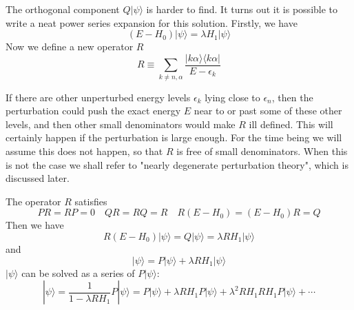 The orthogonal component $Q|\psi\rangle$ is harder to find. It turns out it is possible to write a neat power series expansion for this solution. Firstly, we have
\[(E-H_0)|\psi\rangle = \lambda H_1 |\psi\rangle\]
Now we define a new operator $R$
\[R \equiv \sum_{k \neq n,\alpha} \frac{|k\alpha\rangle \langle k\alpha|}{E-\epsilon_k}\]
\begin{note}
If there are other unperturbed energy levels $\epsilon_k$ lying close to $\epsilon_n$, then the perturbation could push
the exact energy $E$ near to or past some of these other levels, and then other small denominators would make $R$ ill defined.
This will certainly happen if the perturbation is large enough. For the time being we will assume this does not happen, so that $R$ is free of small denominators. When this is not the case we shall refer to "nearly degenerate perturbation theory", which is discussed later.
\end{note}
\noindent
The operator $R$ satisfies
\[PR=RP=0 \quad QR=RQ=R \quad R(E-H_0) = (E-H_0)R = Q\]
Then we have
\[R(E-H_0)|\psi\rangle = Q|\psi\rangle = \lambda RH_1 |\psi\rangle\]
and
\[|\psi\rangle = P|\psi\rangle + \lambda R H_1 |\psi\rangle\]
$|\psi\rangle$ can be solved as a series of $P|\psi\rangle$:
\[|\psi\rangle = \frac{1}{1-\lambda RH_1} P|\psi\rangle = P|\psi\rangle + \lambda RH_1P|\psi\rangle + \lambda^2 RH_1RH_1 P|\psi\rangle + \cdots\]

